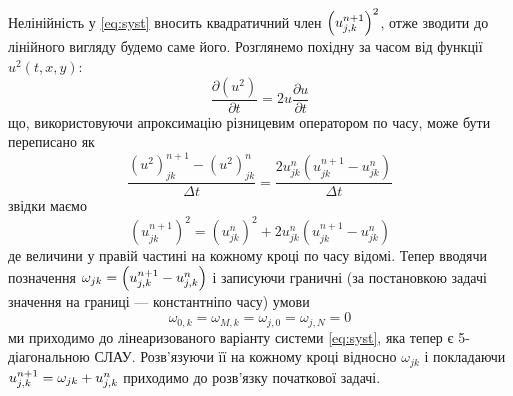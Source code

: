 Нелінійність у \eqref{eq:syst} вносить квадратичний член $\left(\upl{0}{0}\right)^2$, отже зводити до лінійного вигляду будемо саме його. Розглянемо похідну за часом від функції $u^2(t,x,y)$:
\begin{equation}
\frac{\partial\left(u^2\right)}{\partial t} = 2u\frac{\partial u}{\partial t}
\end{equation}
що, використовуючи апроксимацію різницевим оператором по часу, може бути переписано як
\begin{equation}
\frac{\left(u^2\right)^{n+1}_{jk} - \left(u^2\right)^{n}_{jk}}{\Delta t} = \frac{2u^n_{jk}\left(u^{n+1}_{jk} - u^n_{jk}\right)}{\Delta t}
\end{equation}
звідки маємо
\begin{equation}
\left(u^{n+1}_{jk}\right)^2 = \left(u^{n}_{jk}\right)^2 + 2u^n_{jk}\left(u^{n+1}_{jk} - u^n_{jk}\right)
\end{equation}
де величини у правій частині на кожному кроці по часу відомі.
Тепер вводячи позначення $\omega_{jk} = \left(\upl{0}{0} - \un{0}{0}\right)$ і записуючи граничні (за постановкою задачі значення на границі --- константніпо часу) умови
\begin{equation}
\omega_{0,k} = \omega_{M,k} = \omega_{j,0} = \omega_{j,N} = 0
\end{equation}
ми приходимо до лінеаризованого варіанту системи \eqref{eq:syst}, яка тепер є 5-діагональною СЛАУ. Розв’язуючи її на кожному кроці відносно $\omega_{jk}$ і покладаючи $\upl{0}{0} = \omega_{jk} + \un{0}{0}$ приходимо до розв’язку початкової задачі.
